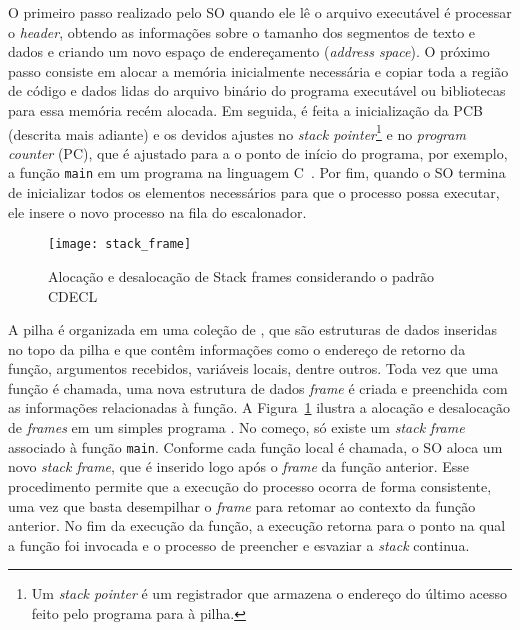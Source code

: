 O primeiro passo realizado pelo SO quando ele lê o arquivo executável é processar o \emph{header}, obtendo as informações sobre o tamanho dos segmentos de
texto e dados e criando um novo espaço de endereçamento (\emph{address space}).
O próximo passo consiste em alocar a memória inicialmente necessária e copiar
toda a região de código e dados lidas do arquivo binário do programa executável ou bibliotecas para essa memória
recém alocada. Em seguida, é feita a inicialização da PCB (descrita mais adiante)
e os devidos ajustes no \emph{stack pointer}\footnote{Um \emph{stack pointer} é
um registrador que armazena o endereço do último acesso feito pelo programa
para à pilha.} e no \emph{program counter} (PC), que é ajustado para a
o ponto de início do programa, por exemplo, a função \texttt{main} em um programa na linguagem C~\citep{patterson}. Por fim, quando o SO termina
de inicializar todos os elementos necessários para que o processo possa
executar, ele insere o novo processo na fila do escalonador.

\begin{figure}[!h]
  \centering
  \texttt{[image: stack\_frame]}
	\caption[Alocação e desalocação de Stack frames considerando o padrão CDECL]{Alocação e desalocação de Stack frames considerando o padrão CDECL~\citep{patterson}}
  \label{fig:stack_frames} 
\end{figure}


A pilha é organizada em uma coleção de , que
são estruturas de dados inseridas no topo da pilha e que contêm
informações como o endereço de retorno da função, argumentos recebidos,
variáveis locais, dentre outros. Toda vez que uma função é chamada, uma nova
estrutura de dados \emph{frame} é criada e preenchida com as informações
relacionadas à função.  A Figura~\ref{fig:stack_frames} ilustra a alocação e
desalocação de \textit{frames} em um simples programa \citep{gdb}. No começo,
só existe um \emph{stack frame} associado à função \texttt{main}. Conforme cada
função local é chamada, o SO aloca um novo \emph{stack frame}, que é inserido
logo após o \emph{frame} da função anterior. Esse procedimento permite que a
execução do processo ocorra de forma consistente, uma vez que basta desempilhar
o \emph{frame} para retomar ao contexto da função anterior. No fim da execução
da função, a execução retorna para o ponto na qual a função foi invocada e o
processo de preencher e esvaziar a \emph{stack} continua.

